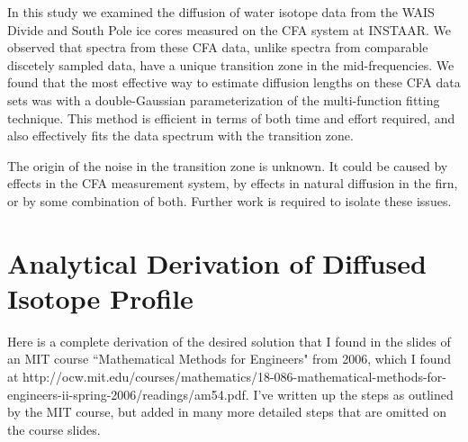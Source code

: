 \documentclass[draft, jgrga]{AGUTeX}
\begin{document}
\begin{article}
In this study we examined the diffusion of water isotope data from the WAIS Divide and South Pole ice cores measured on the CFA system at INSTAAR. We observed that spectra from these CFA data, unlike spectra from comparable discetely sampled data, have a unique transition zone in the mid-frequencies. We found that the most effective way to estimate diffusion lengths on these CFA data sets was with a double-Gaussian parameterization of the multi-function fitting technique. This method is efficient in terms of both time and effort required, and also effectively fits the data spectrum with the transition zone.

The origin of the noise in the transition zone is unknown. It could be caused by effects in the CFA measurement system, by effects in natural diffusion in the firn, or by some combination of both. Further work is required to isolate these issues.







\appendix

\section{Analytical Derivation of Diffused Isotope Profile}

Here is a complete derivation of the desired solution that I found in the slides of an MIT course ``Mathematical Methods for Engineers" from 2006, which I found at http://ocw.mit.edu/courses/mathematics/18-086-mathematical-methods-for-engineers-ii-spring-2006/readings/am54.pdf. I've written up the steps as outlined by the MIT course, but added in many more detailed steps that are omitted on the course slides.\\


\end{article}
\end{document}
